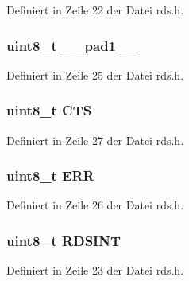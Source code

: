 Definiert in Zeile 22 der Datei rds.\+h.

\hypertarget{structstatus_a77f12d2e278bd5c07712648ac0df5e08}{}
\subsubsection[{\+\_\+\+\_\+pad1\+\_\+\+\_\+}]{\setlength{\rightskip}{0pt plus 5cm}uint8\+\_\+t \+\_\+\+\_\+pad1\+\_\+\+\_\+}\label{structstatus_a77f12d2e278bd5c07712648ac0df5e08}


Definiert in Zeile 25 der Datei rds.\+h.

\hypertarget{structstatus_a7f1760325354f291b9a0190e7e355ca8}{}
\subsubsection[{C\+T\+S}]{\setlength{\rightskip}{0pt plus 5cm}uint8\+\_\+t C\+T\+S}\label{structstatus_a7f1760325354f291b9a0190e7e355ca8}


Definiert in Zeile 27 der Datei rds.\+h.

\hypertarget{structstatus_afb74dff3cfacd68c02883e5282ef2f59}{}
\subsubsection[{E\+R\+R}]{\setlength{\rightskip}{0pt plus 5cm}uint8\+\_\+t {\bf E\+R\+R}}\label{structstatus_afb74dff3cfacd68c02883e5282ef2f59}


Definiert in Zeile 26 der Datei rds.\+h.

\hypertarget{structstatus_a4fac7351844086822dbf634529f6cfbd}{}
\subsubsection[{R\+D\+S\+I\+N\+T}]{\setlength{\rightskip}{0pt plus 5cm}uint8\+\_\+t R\+D\+S\+I\+N\+T}\label{structstatus_a4fac7351844086822dbf634529f6cfbd}


Definiert in Zeile 23 der Datei rds.\+h.

\hypertarget{structstatus_a9637ec0bb6d40570ea68a1b96c5d561e}{}
